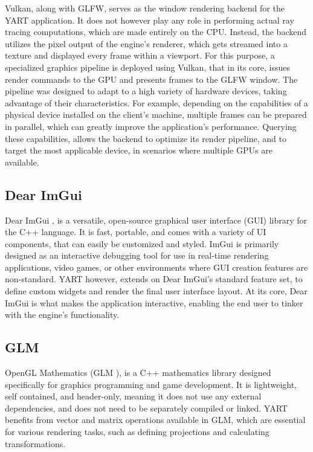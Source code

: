 Vulkan, along with GLFW, serves as the window rendering backend for the YART application.
It does not however play any role in performing actual ray tracing computations, which are made entirely on the CPU. 
Instead, the backend utilizes the pixel output of the engine's renderer, which gets streamed into a texture and displayed every frame within a viewport.
For this purpose, a specialized graphics pipeline is deployed using Vulkan, that in its core, issues render commands to the GPU and presents frames to the GLFW window. The pipeline was designed to adapt to a high variety of hardware devices, taking advantage of their characteristics.
For example, depending on the capabilities of a physical device installed on the client's machine, multiple frames can be prepared in parallel, which can greatly improve the application's performance.
Querying these capabilities, allows the backend to optimize its render pipeline, and to target the most applicable device, in scenarios where multiple GPUs are available.

\subsection{Dear ImGui}

Dear ImGui \supercite{DearImGui}, is a versatile, open-source graphical user interface (GUI) library for the C++ language. 
It is fast, portable, and comes with a variety of UI components, that can easily be customized and styled.
ImGui is primarily designed as an interactive debugging tool for use in real-time rendering applications, video games, or other environments where GUI creation features are non-standard.
YART however, extends on Dear ImGui's standard feature set, to define custom widgets and render the final user interface layout. 
At its core, Dear ImGui is what makes the application interactive, enabling the end user to tinker with the engine's functionality.

\subsection{GLM}

OpenGL Mathematics (GLM \supercite{GLM}), is a C++ mathematics library designed specifically for graphics programming and game development.
It is lightweight, self contained, and header-only, meaning it does not use any external dependencies, and does not need to be separately compiled or linked.
YART benefits from vector and matrix operations available in GLM, which are essential for various rendering tasks, such as defining projections and calculating transformations.
